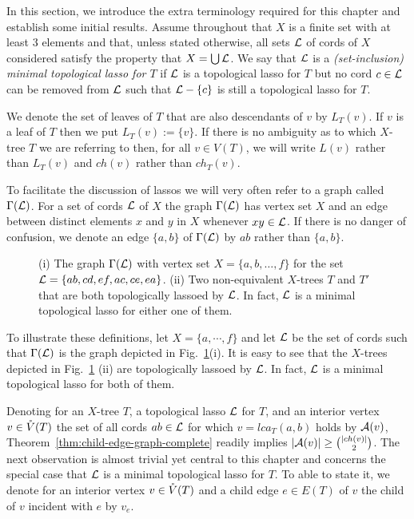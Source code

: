 In this section, we introduce the extra terminology required for this chapter
and establish some initial results.  Assume throughout that $X$ is a finite
set with at least 3 elements and that, unless stated otherwise, all sets ${\mathcal L}$
of cords of $X$ considered satisfy the property that $X=\bigcup {\mathcal L}$.  We say
that ${\mathcal L}$ is a {\em (set-inclusion) minimal topological lasso for $T$} if
${\mathcal L}$ is a topological lasso for $T$ but no cord $c \in {\mathcal L}$ can be removed
from ${\mathcal L}$ such that ${\mathcal L}-\{c\}$ is still a topological lasso for $T$.

We denote the set of leaves of $T$ that are also descendants of $v$ by
$L_T(v)$. If $v$ is a leaf of $T$ then we put $L_T(v):=\{v\}$. If there is no
ambiguity as to which $X$-tree $T$ we are referring to then, for all $v\in
V(T)$, we will write $L(v)$ rather than $L_T(v)$ and $ch(v)$ rather than
$ch_T(v)$.

To facilitate the discussion of lassos we will very often refer to a graph
called $\Gamma({\mathcal L})$.  For a set of cords ${\mathcal L}$ of $X$ the graph $\Gamma({\mathcal L})$
has vertex set $X$ and an edge between distinct elements $x$ and $y$ in $X$
whenever $xy \in {\mathcal L}$.  If there is no danger of confusion, we denote an edge
$\{a,b\}$ of $\Gamma({\mathcal L})$ by $ab$ rather than $\{a,b\}$.

\begin{figure}[h]
  \begin{center}
    
  \end{center}
  \caption{(i) The graph $\Gamma({\mathcal L})$ with vertex set $X=\{a,b,\ldots,f\}$
    for the set ${\mathcal L}=\{ab,cd,ef,ac,ce,ea\}$. (ii) Two non-equivalent $X$-trees
    $T$ and $T'$ that are both topologically lassoed by ${\mathcal L}$. In fact, ${\mathcal L}$
    is a minimal topological lasso for either one of them.}
  \label{fig:block-graph-motivation}
\end{figure}

To illustrate these definitions, let $X=\{a,\cdots,f\}$ and let ${\mathcal L}$ be the
set of cords such that $\Gamma({\mathcal L})$ is the graph depicted in
Fig.~\ref{fig:block-graph-motivation}(i).  It is easy to see that the
$X$-trees depicted in Fig.~\ref{fig:block-graph-motivation} (ii) are
topologically lassoed by ${\mathcal L}$. In fact, ${\mathcal L}$ is a minimal topological lasso
for both of them.

Denoting for an $X$-tree $T$, a topological lasso ${\mathcal L}$ for $T$, and an
interior vertex $v\in \mathring{V}(T)$ the set of all cords $ab\in {\mathcal L}$ for which
$v=lca_T(a,b)$ holds by ${\mathcal A}(v)$, Theorem~\ref{thm:child-edge-graph-complete}
readily implies $|{\mathcal A}(v)|\geq {|ch(v)|\choose 2}$.  The next observation is
almost trivial yet central to this chapter and concerns the special case that
${\mathcal L}$ is a minimal topological lasso for $T$.  To able to state it, we denote
for an interior vertex $v\in \mathring{V}(T)$ and a child edge $e\in E(T)$ of $v$ the
child of $v$ incident with $e$ by $v_e$.


